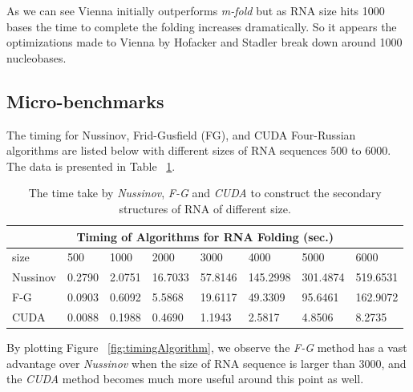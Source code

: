 \documentclass[12pt]{article}
\begin{document}
As we can see Vienna initially outperforms \textit{m-fold} but as RNA size hits 1000 bases the time to
complete the folding increases dramatically. So it appears the optimizations made to Vienna by Hofacker and
Stadler\cite{circular} break down around 1000 nucleobases.

\subsection{Micro-benchmarks}
The timing for Nussinov, Frid-Gusfield (FG), and CUDA Four-Russian algorithms are listed below with different sizes of RNA sequences 500 to 6000. The data is presented in Table ~\ref{table:timingAlgorithm}.\\
\begin{table}
\begin{center}
    \begin{tabular}{ |p{1.5cm}||p{1.2cm}|p{1.3cm}|p{1.3cm}|p{1.4cm}|p{1.4cm}|p{1.4cm}|p{1.6cm}|}
     \hline
     \multicolumn{8}{|c|}{Timing of Algorithms for RNA Folding (sec.)} \\
     \hline
     size& 500& 1000& 2000& 3000& 4000& 5000& 6000\\
     \hline
     Nussinov& 0.2790& 2.0751& 16.7033& 57.8146& 145.2998& 301.4874& 519.6531\\
     F-G& 0.0903& 0.6092& 5.5868& 19.6117& 49.3309& 95.6461& 162.9072\\
     CUDA& 0.0088& 0.1988& 0.4690& 1.1943& 2.5817& 4.8506& 8.2735\\
     \hline
    \end{tabular}
\end{center}
\caption{The time take by \textit{Nussinov}, \textit{F-G} and \textit{CUDA} to construct the secondary structures of RNA of different size.}
\label{table:timingAlgorithm}
\end{table}
\par By plotting Figure ~\ref{fig:timingAlgorithm}, we observe the \textit{F-G} method has a vast advantage
over \textit{Nussinov} when the size of RNA sequence is larger than 3000, and the \textit{CUDA} method
becomes much more useful around this point as well.
\end{document}
